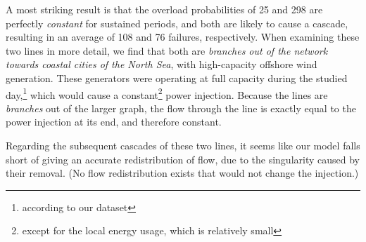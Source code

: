 \documentclass[main.tex]{subfiles}
\begin{document}
A most striking result is that the overload probabilities of 25 and 298 are perfectly \emph{constant} for sustained periods, and both are likely to cause a cascade, resulting in an average of 108 and 76 failures, respectively. When examining these two lines in more detail, we find that both are \emph{branches out of the network towards coastal cities of the North Sea}, with high-capacity offshore wind generation. These generators were operating at full capacity during the studied day,\footnote{according to our dataset} which would cause a constant\footnote{except for the local energy usage, which is relatively small} power injection. Because the lines are \emph{branches} out of the larger graph, the flow through the line is exactly equal to the power injection at its end, and therefore constant.

Regarding the subsequent cascades of these two lines, it seems like our model falls short of giving an accurate redistribution of flow, due to the singularity caused by their removal. (No flow redistribution exists that would not change the injection.) 
\end{document}
